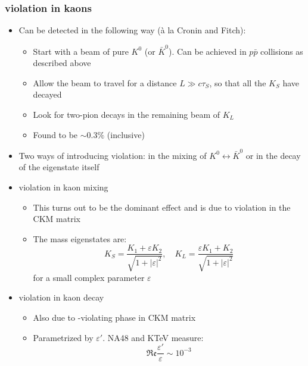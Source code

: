  \subsubsection{\CP violation in kaons}
  \begin{itemize}
    \item Can be detected in the following way (\`a la Cronin and Fitch):
    \begin{itemize}
      \item Start with a beam of pure $K^0$ (or $\bar K^0$). Can be achieved in $p\bar p$ collisions as described above
      \item Allow the beam to travel for a distance $L\gg c\tau_S$, so that all the $K_S$ have decayed
      \item Look for two-pion decays in the remaining beam of $K_L$
      \item Found to be $\sim 0.3\%$ (inclusive)
    \end{itemize}
    \item Two ways of introducing \CP violation: in the mixing of $K^0\leftrightarrow \bar K^0$ or in the decay of the \CP eigenstate itself
    \item \CP violation in kaon mixing
    \begin{itemize}
      \item This turns out to be the dominant effect and is due to \CP violation in the CKM matrix
      \item The mass eigenstates are:
      \begin{equation}
        K_S = \frac{K_1 + \varepsilon K_2}{\sqrt{1+|\varepsilon|^2}},\quad K_L = \frac{\varepsilon K_1 +  K_2}{\sqrt{1+|\varepsilon|^2}}
      \end{equation}
      for a small complex parameter $\varepsilon$
    \end{itemize}
    \item \CP violation in kaon decay
    \begin{itemize}
      \item Also due to \CP-violating phase in CKM matrix
      \item Parametrized by $\varepsilon'$. NA48 and KTeV measure:
      \begin{equation}
        \mathfrak{Re} \frac{\varepsilon'}{\varepsilon} \sim 10^{-3}
      \end{equation}
    \end{itemize}
  \end{itemize}

